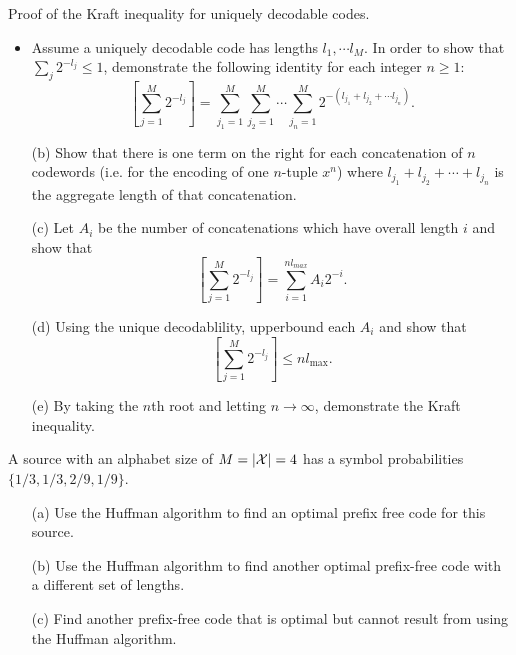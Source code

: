 \documentclass{assignment}
\begin{document}
\begin{prob}[2.11]
    Proof of the Kraft inequality for uniquely decodable codes.
    \begin{itemize}
        \item Assume a uniquely decodable code has lengths $l_1,\cdots l_M$. In order to show that $\sum_j2^{-l_j}\leq 1$, demonstrate the following identity for each integer $n\geq 1$:
        \[
            \left[\sum_{j=1}^M2^{-l_j}\right]=\sum_{j_1=1}^M\sum_{j_2=1}^M\cdots\sum_{j_n=1}^M2^{-(l_{j_1}+l_{j_2}+\cdots l_{j_n})}.
        \]
        \item[(b)] Show that there is one term on the right for each concatenation of $n$ codewords (i.e. for the encoding of one $n$-tuple $x^n$) where $l_{j_1}+l_{j_2}+\cdots+l_{j_n}$ is the aggregate length of that concatenation.
        \item[(c)] Let $A_i$ be the number of concatenations which have overall length $i$ and show that
        \[
            \left[\sum_{j=1}^M2^{-l_j}\right]=\sum_{i=1}^{nl_{max}}A_i2^{-i}.
        \]
        \item[(d)] Using the unique decodablility, upperbound each $A_i$ and show that
        \[
            \left[\sum_{j=1}^M2^{-l_j}\right]\leq nl_{\max}.
        \]
        \item[(e)] By taking the $n$th root and letting $n\rightarrow\infty$, demonstrate the Kraft inequality.
    \end{itemize}
\end{prob}
\begin{pf}
\end{pf}

\begin{prob}[2.12]
    A source with an alphabet size of $M=\left\lvert\mathcal{X}\right\rvert=4$ has a symbol probabilities $\{1/3,1/3,2/9,1/9\}$.
    \begin{itemize}
        \item[(a)] Use the Huffman algorithm to find an optimal prefix free code for this source.
        \item[(b)] Use the Huffman algorithm to find another optimal prefix-free code with a different set of lengths.
        \item[(c)] Find another prefix-free code that is optimal but cannot result from using the Huffman algorithm.
    \end{itemize}
\end{prob}
\begin{sol}
\end{sol}
\end{document}
